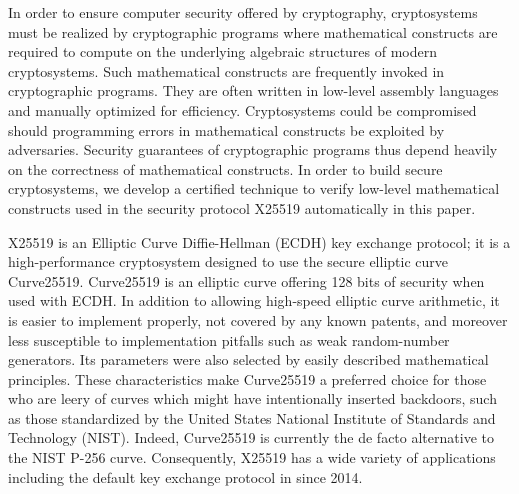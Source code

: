 
In order to ensure computer security offered by cryptography,
cryptosystems must be realized by cryptographic programs where mathematical
constructs are required to compute on the underlying algebraic
structures of modern cryptosystems.
Such mathematical constructs are frequently invoked in cryptographic
programs. They are often written in low-level assembly languages and
manually optimized for efficiency. 
Cryptosystems could be compromised should programming
errors in mathematical constructs be exploited by adversaries.
Security guarantees of cryptographic programs
thus depend heavily on the correctness of mathematical constructs.
In order to build secure cryptosystems, we develop a certified
technique to verify low-level mathematical constructs used in the
security protocol X25519 automatically in this paper.

X25519 is an Elliptic Curve Diffie-Hellman (ECDH) key exchange
protocol; it is a high-performance cryptosystem designed to 
use the secure elliptic curve Curve25519. Curve25519 is an elliptic
curve offering 128 bits of security when used with ECDH. In addition
to allowing high-speed elliptic curve arithmetic, it is easier to
implement properly, not covered by any known patents, and moreover
less susceptible to implementation pitfalls such as weak 
random-number generators. Its parameters were also selected by
easily described mathematical principles.
These characteristics make Curve25519 a
preferred choice for those who are leery of curves which might have
intentionally inserted
backdoors, such as those standardized by the United States National
Institute of Standards and Technology (NIST). 
Indeed, Curve25519 is currently the
de facto alternative to the NIST P-256 curve. Consequently, X25519 has
a wide variety of applications including the default key exchange
protocol in \openssh since 2014.


